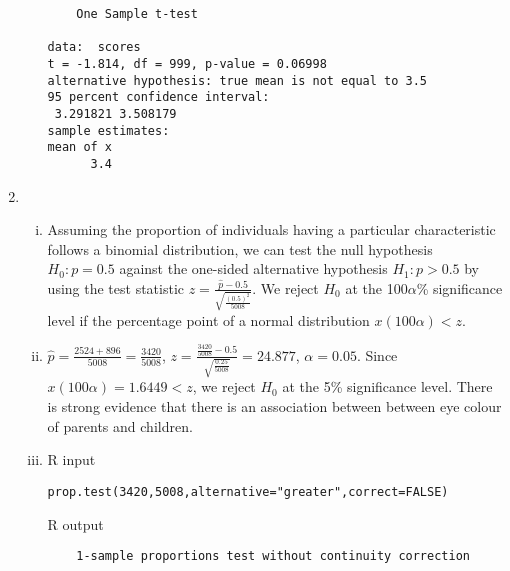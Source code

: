 \documentclass[10pt]{article}
\begin{document}
\begin{enumerate}
\begin{enumerate}[(i)]
\begin{verbatim}
	One Sample t-test

data:  scores
t = -1.814, df = 999, p-value = 0.06998
alternative hypothesis: true mean is not equal to 3.5
95 percent confidence interval:
 3.291821 3.508179
sample estimates:
mean of x 
      3.4 
                    \end{verbatim}
            \end{enumerate}
        \item
            \begin{enumerate}[(i)]
                \item Assuming the proportion of individuals having a
                    particular characteristic follows a binomial distribution,
                    we can test the null hypothesis $H_0: p = 0.5$ against the
                    one-sided alternative hypothesis $H_1: p > 0.5$ by using
                    the test statistic $z = \frac{\hat{p}-0.5}{\sqrt{\frac{(0.5)^2}{5008}}}$. We reject
                    $H_0$ at the 100$\alpha$\% significance level if the
                    percentage point of a normal distribution $x(100\alpha) < z$.
                \item $\hat{p} = \frac{2524 + 896}{5008} = \frac{3420}{5008}$,
                    $z = \frac{\frac{3420}{5008} - 0.5}{\sqrt{\frac{0.25}{5008}}} = 24.877$, $\alpha = 0.05$.
                    Since $x(100\alpha) = 1.6449 < z$, we reject $H_0$ at the
                    5\% significance level. There is strong evidence that there
                    is an association between between eye colour of parents and
                    children.
                \item R input
                    \begin{verbatim}
prop.test(3420,5008,alternative="greater",correct=FALSE)
                    \end{verbatim}
                    R output
                    \begin{verbatim}
	1-sample proportions test without continuity correction


\end{verbatim}
\end{enumerate}
\end{enumerate}
\end{document}
